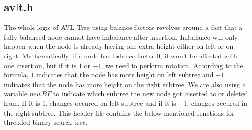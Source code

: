 \documentclass{article}
\begin{document}
\subsection{avlt.h}
The whole logic of AVL Tree using balance factors revolves around a fact that a fully balanced node cannot have imbalance after insertion. Imbalance will only happen when the node is already having one extra height either on left or on right. Mathematically, if a node has balance factor $0$, it won't be affected with one insertion, but if it is $1$ or $-1$, we need to perform rotation. According to the formula, $1$ indicates that the node has more height on left subtree and $-1$ indicates that the node has more height on the right subtree. We are also using a variable $newBF$ to indicate which subtree the new node got inserted to or deleted from. If it is $1$, changes occured on left subtree and if it is $-1$, changes occured in the right subtree.
This header file contains the below mentioned functions for threaded binary search tree.
\end{document}
